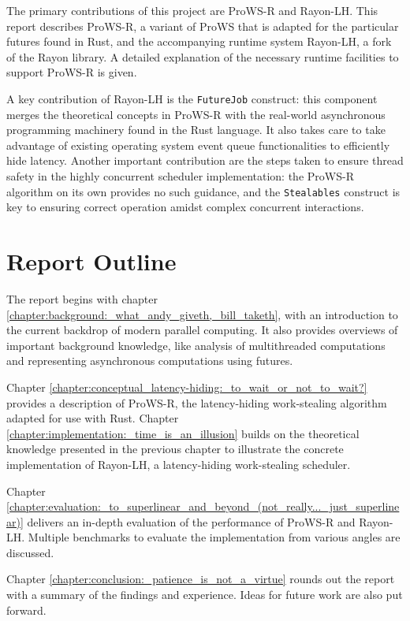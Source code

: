 \documentclass[bsc,frontabs,singlespacing,parskip,deptreport,normalheadings]{infthesis}
\begin{document}
The primary contributions of this project are ProWS-R and Rayon-LH. This report
describes ProWS-R, a variant of ProWS that is adapted for the particular futures
found in Rust, and the accompanying runtime system Rayon-LH, a fork of the Rayon
library. A detailed explanation of the necessary runtime facilities to support
ProWS-R is given.

A key contribution of Rayon-LH is the \texttt{FutureJob} construct: this
component merges the theoretical concepts in ProWS-R with the real-world
asynchronous programming machinery found in the Rust language. It also
takes care to take advantage of existing operating system event queue
functionalities to efficiently hide latency. Another important contribution are
the steps taken to ensure thread safety in the highly concurrent scheduler
implementation: the ProWS-R algorithm on its own provides no such guidance, and
the \texttt{Stealables} construct is key to ensuring correct operation amidst
complex concurrent interactions.

\section{Report Outline}

The report begins with chapter
\ref{chapter:background:_what_andy_giveth,_bill_taketh}, with an introduction to
the current backdrop of modern parallel computing. It also provides overviews of
important background knowledge, like analysis of multithreaded computations and
representing asynchronous computations using futures.

Chapter \ref{chapter:conceptual_latency-hiding:_to_wait_or_not_to_wait?}
provides a description of ProWS-R, the latency-hiding work-stealing algorithm
adapted for use with Rust. Chapter
\ref{chapter:implementation:_time_is_an_illusion} builds on the theoretical
knowledge presented in the previous chapter to illustrate the concrete
implementation of Rayon-LH, a latency-hiding work-stealing scheduler.

Chapter
\ref{chapter:evaluation:_to_superlinear_and_beyond_(not_really..._just_superlinear)}
delivers an in-depth evaluation of the performance of ProWS-R and Rayon-LH.
Multiple benchmarks to evaluate the implementation from various angles are
discussed.

Chapter \ref{chapter:conclusion:_patience_is_not_a_virtue} rounds out the report
with a summary of the findings and experience. Ideas for future work are also
put forward.
\end{document}
